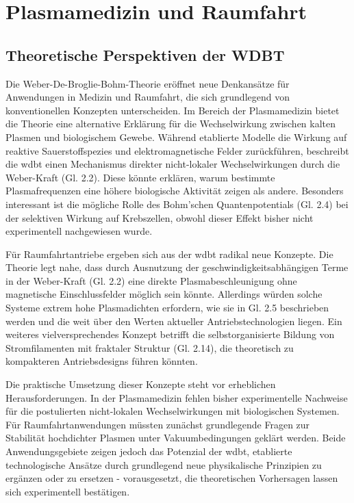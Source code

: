 \chapter{Plasmamedizin und Raumfahrt}
\section{Theoretische Perspektiven der WDBT}
Die Weber-De-Broglie-Bohm-Theorie eröffnet neue Denkansätze für Anwendungen in Medizin und Raumfahrt, die sich grundlegend von konventionellen Konzepten unterscheiden. Im Bereich
der Plasmamedizin bietet die Theorie eine alternative Erklärung für die Wechselwirkung zwischen kalten Plasmen und biologischem Gewebe. Während etablierte Modelle die Wirkung auf
reaktive Sauerstoffspezies und elektromagnetische Felder zurückführen, beschreibt die \gls{wdbt} einen Mechanismus direkter nicht-lokaler Wechselwirkungen durch die Weber-Kraft
(Gl. 2.2). Diese könnte erklären, warum bestimmte Plasmafrequenzen eine höhere biologische Aktivität zeigen als andere. Besonders interessant ist die mögliche Rolle des
Bohm'schen Quantenpotentials (Gl. 2.4) bei der selektiven Wirkung auf Krebszellen, obwohl dieser Effekt bisher nicht experimentell nachgewiesen wurde.

Für Raumfahrtantriebe ergeben sich aus der \gls{wdbt} radikal neue Konzepte. Die Theorie legt nahe, dass durch Ausnutzung der geschwindigkeitsabhängigen Terme in der
Weber-Kraft (Gl. 2.2) eine direkte Plasmabeschleunigung ohne magnetische Einschlussfelder möglich sein könnte. Allerdings würden solche Systeme extrem hohe Plasmadichten erfordern,
wie sie in Gl. 2.5 beschrieben werden und die weit über den Werten aktueller Antriebstechnologien liegen. Ein weiteres vielversprechendes Konzept betrifft die selbstorganisierte
Bildung von Stromfilamenten mit fraktaler Struktur (Gl. 2.14), die theoretisch zu kompakteren Antriebsdesigns führen könnten.

Die praktische Umsetzung dieser Konzepte steht vor erheblichen Herausforderungen. In der Plasmamedizin fehlen bisher experimentelle Nachweise für die postulierten nicht-lokalen
Wechselwirkungen mit biologischen Systemen. Für Raumfahrtanwendungen müssten zunächst grundlegende Fragen zur Stabilität hochdichter Plasmen unter Vakuumbedingungen geklärt werden.
Beide Anwendungsgebiete zeigen jedoch das Potenzial der \gls{wdbt}, etablierte technologische Ansätze durch grundlegend neue physikalische Prinzipien zu ergänzen oder zu
ersetzen - vorausgesetzt, die theoretischen Vorhersagen lassen sich experimentell bestätigen.
